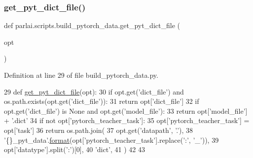 \subsubsection{\texorpdfstring{get\+\_\+pyt\+\_\+dict\+\_\+file()}{get\_pyt\_dict\_file()}}
{\footnotesize\ttfamily def parlai.\+scripts.\+build\+\_\+pytorch\+\_\+data.\+get\+\_\+pyt\+\_\+dict\+\_\+file (\begin{DoxyParamCaption}\item[{}]{opt }\end{DoxyParamCaption})}



Definition at line 29 of file build\+\_\+pytorch\+\_\+data.\+py.


\begin{DoxyCode}
29 \textcolor{keyword}{def }\hyperlink{namespaceparlai_1_1scripts_1_1build__pytorch__data_a6ec85a5842150af78f5178d75075b0cc}{get\_pyt\_dict\_file}(opt):
30     \textcolor{keywordflow}{if} opt.get(\textcolor{stringliteral}{'dict\_file'}) \textcolor{keywordflow}{and} os.path.exists(opt.get(\textcolor{stringliteral}{'dict\_file'})):
31         \textcolor{keywordflow}{return} opt[\textcolor{stringliteral}{'dict\_file'}]
32     \textcolor{keywordflow}{if} opt.get(\textcolor{stringliteral}{'dict\_file'}) \textcolor{keywordflow}{is} \textcolor{keywordtype}{None} \textcolor{keywordflow}{and} opt.get(\textcolor{stringliteral}{'model\_file'}):
33         \textcolor{keywordflow}{return} opt[\textcolor{stringliteral}{'model\_file'}] + \textcolor{stringliteral}{'.dict'}
34     \textcolor{keywordflow}{if} \textcolor{keywordflow}{not} opt[\textcolor{stringliteral}{'pytorch\_teacher\_task'}]:
35         opt[\textcolor{stringliteral}{'pytorch\_teacher\_task'}] = opt[\textcolor{stringliteral}{'task'}]
36     \textcolor{keywordflow}{return} os.path.join(
37         opt.get(\textcolor{stringliteral}{'datapath'}, \textcolor{stringliteral}{'.'}),
38         \textcolor{stringliteral}{'\{\}\_pyt\_data'}.\hyperlink{namespaceparlai_1_1chat__service_1_1services_1_1messenger_1_1shared__utils_a32e2e2022b824fbaf80c747160b52a76}{format}(opt[\textcolor{stringliteral}{'pytorch\_teacher\_task'}].replace(\textcolor{stringliteral}{':'}, \textcolor{stringliteral}{'\_'})),
39         opt[\textcolor{stringliteral}{'datatype'}].split(\textcolor{stringliteral}{':'})[0],
40         \textcolor{stringliteral}{'dict'},
41     )
42 
43 
\end{DoxyCode}
\mbox{\label{namespaceparlai_1_1scripts_1_1build__pytorch__data_a1c8f4633b7dc8e990a3e1f6c3e92bd3f}} 
